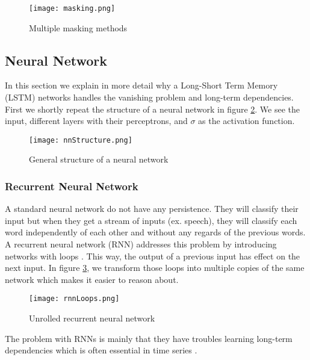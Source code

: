\begin{figure}[!htb]
	\centering
	\texttt{[image: masking.png]}
	\caption{Multiple masking methods \cite{dl4jRnn:online}}
	\label{fig:masking}
\end{figure} 


\subsection{Neural Network}
\label{sec:nn}

In this section we explain in more detail why a Long-Short Term Memory (LSTM) \cite{lstmOrginin:article} networks handles the vanishing problem and long-term dependencies. \\

First we shortly repeat the structure of a neural network in figure \ref{fig:nnStructure}. We see the input, different layers with their perceptrons, and $\sigma$ as the activation function. 

\begin{figure}[H]
	\centering
	\texttt{[image: nnStructure.png]}
	\caption{General structure of a neural network \cite{IMECJaak}}
	\label{fig:nnStructure}
\end{figure} 

\subsubsection{Recurrent Neural Network}
\label{sec:rnn}

A standard neural network do not have any persistence. They will classify their input but when they get a stream of inputs (ex. speech), they will classify each word independently of each other and without any regards of the previous words. A recurrent neural network (RNN) addresses this problem by introducing networks with loops \cite{rnnOrigin:article}. This way, the output of a previous input has effect on the next input. In figure \ref{fig:rnnLoops}, we transform those loops into multiple copies of the same network which makes it easier to reason about.

\begin{figure}[H]
	\centering
	\texttt{[image: rnnLoops.png]}
	\caption{Unrolled recurrent neural network \cite{IMECJaak}}
	\label{fig:rnnLoops}
\end{figure} 

The problem with RNNs is mainly that they have troubles learning long-term dependencies which is often essential in time series \cite{longDepRNN:article}.


